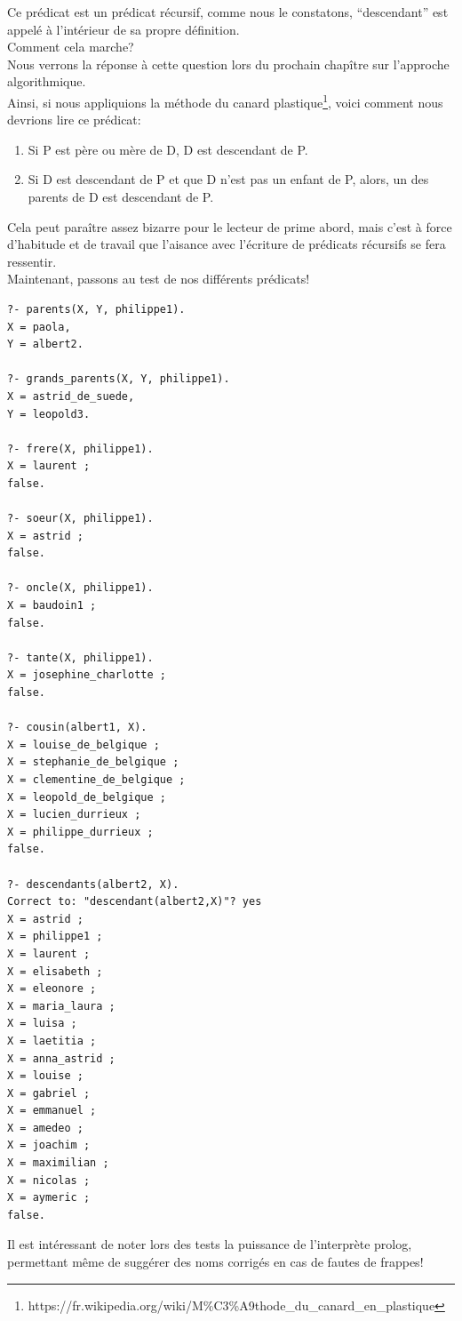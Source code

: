 \documentclass[a4paper, 12pt]{article}
\numberwithin{equation}{subsection}
\begin{document}

Ce prédicat est un prédicat récursif, comme nous le constatons, ``descendant'' est appelé à l'intérieur de sa propre définition. \\ Comment cela marche? \\
Nous verrons la réponse à cette question lors du prochain chapître sur l'approche algorithmique. \\
Ainsi, si nous appliquions la méthode du canard plastique\footnote{https://fr.wikipedia.org/wiki/M\%C3\%A9thode\_du\_canard\_en\_plastique}, voici comment nous devrions lire ce prédicat: \\
\begin{enumerate}
  \item Si P est père ou mère de D, D est descendant de P.
  \item Si D est descendant de P et que D n'est pas un enfant de P, alors, un des parents de D est descendant de P.
\end{enumerate}
Cela peut paraître assez bizarre pour le lecteur de prime abord, mais c'est à force d'habitude et de travail que l'aisance avec l'écriture de prédicats récursifs se fera ressentir.\\
Maintenant, passons au test de nos différents prédicats!
\begin{lstlisting}
?- parents(X, Y, philippe1).
X = paola,
Y = albert2.

?- grands_parents(X, Y, philippe1).
X = astrid_de_suede,
Y = leopold3.

?- frere(X, philippe1).
X = laurent ;
false.

?- soeur(X, philippe1).
X = astrid ;
false.

?- oncle(X, philippe1).
X = baudoin1 ;
false.

?- tante(X, philippe1).
X = josephine_charlotte ;
false.

?- cousin(albert1, X).
X = louise_de_belgique ;
X = stephanie_de_belgique ;
X = clementine_de_belgique ;
X = leopold_de_belgique ;
X = lucien_durrieux ;
X = philippe_durrieux ;
false.

?- descendants(albert2, X).
Correct to: "descendant(albert2,X)"? yes
X = astrid ;
X = philippe1 ;
X = laurent ;
X = elisabeth ;
X = eleonore ;
X = maria_laura ;
X = luisa ;
X = laetitia ;
X = anna_astrid ;
X = louise ;
X = gabriel ;
X = emmanuel ;
X = amedeo ;
X = joachim ;
X = maximilian ;
X = nicolas ;
X = aymeric ;
false.
\end{lstlisting}
Il est intéressant de noter lors des tests la puissance de l'interprète prolog, permettant même de suggérer des noms corrigés en cas de fautes de frappes!
\newpage
\end{document}
